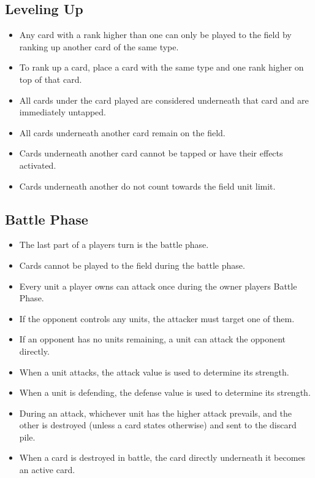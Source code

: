 \subsection{Leveling Up}
\begin{itemize}
    \item Any card with a rank higher than one can only be played to the field by ranking up another card of the same type.
    \item To rank up a card, place a card with the same type and one rank higher on top of that card.
    \item All cards under the card played are considered underneath that card and are immediately untapped.
    \item All cards underneath another card remain on the field.
    \item Cards underneath another card cannot be tapped or have their effects activated.
    \item Cards underneath another do not count towards the field unit limit.
\end{itemize}








\subsection{Battle Phase}
\begin{itemize}
    \item The last part of a players turn is the battle phase.
    \item Cards cannot be played to the field during the battle phase.
    \item Every unit a player owns can attack once during the owner players Battle Phase.
    \item If the opponent controls any units, the attacker must target one of them.
    \item If an opponent has no units remaining, a unit can attack the opponent directly.
    \item When a unit attacks, the attack value is used to determine its strength.
    \item When a unit is defending, the defense value is used to determine its strength.
    \item During an attack, whichever unit has the higher attack prevails, and the other is destroyed (unless a card states otherwise) and sent to the discard pile.
    \item When a card is destroyed in battle, the card directly underneath it becomes an active card.
\end{itemize}








